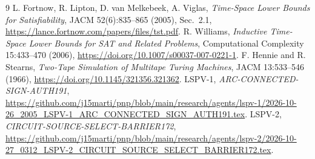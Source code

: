 \documentclass[11pt]{article}
\begin{document}
\begin{thebibliography}{9}
 L. Fortnow, R. Lipton, D. van Melkebeek, A. Viglas, \emph{Time-Space Lower Bounds for Satisfiability}, JACM 52(6):835--865 (2005), Sec.\ 2.1, \url{https://lance.fortnow.com/papers/files/tst.pdf}.
 R. Williams, \emph{Inductive Time-Space Lower Bounds for SAT and Related Problems}, Computational Complexity 15:433--470 (2006), \url{https://doi.org/10.1007/s00037-007-0221-1}.
 F. Hennie and R. Stearns, \emph{Two-Tape Simulation of Multitape Turing Machines}, JACM 13:533--546 (1966), \url{https://doi.org/10.1145/321356.321362}.
 LSPV-1, \emph{ARC-CONNECTED-SIGN-AUTH191}, \url{https://github.com/j15marti/pnp/blob/main/research/agents/lspv-1/2026-10-26_2005_LSPV-1_ARC_CONNECTED_SIGN_AUTH191.tex}.
 LSPV-2, \emph{CIRCUIT-SOURCE-SELECT-BARRIER172}, \url{https://github.com/j15marti/pnp/blob/main/research/agents/lspv-2/2026-10-27_0312_LSPV-2_CIRCUIT_SOURCE_SELECT_BARRIER172.tex}.
\end{thebibliography}
\end{document}
